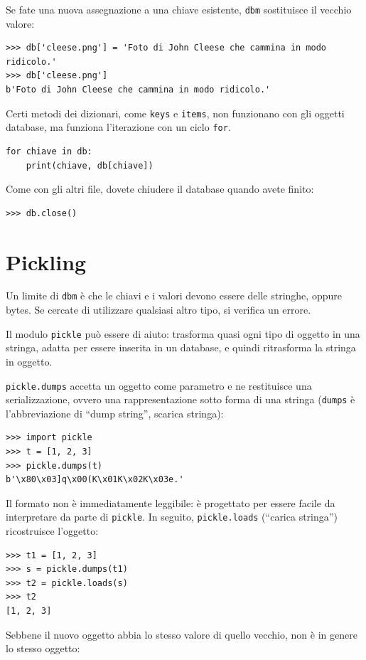 \documentclass[10pt]{book}
\begin{document}
Se fate una nuova assegnazione a una chiave esistente, {\tt dbm} sostituisce il vecchio valore:

\begin{verbatim}
>>> db['cleese.png'] = 'Foto di John Cleese che cammina in modo ridicolo.'
>>> db['cleese.png']
b'Foto di John Cleese che cammina in modo ridicolo.'
\end{verbatim}
%
Certi metodi dei dizionari, come {\tt keys} e {\tt items}, non funzionano con gli oggetti database, ma funziona l'iterazione con un ciclo {\tt for}.

\begin{verbatim}
for chiave in db:
    print(chiave, db[chiave])
\end{verbatim}
%
Come con gli altri file, dovete chiudere il database quando avete finito:

\begin{verbatim}
>>> db.close()
\end{verbatim}
%


\section{Pickling}

Un limite di {\tt dbm} è che le chiavi e i valori devono essere delle stringhe, oppure bytes. Se cercate di utilizzare qualsiasi altro tipo, si verifica un errore.

Il modulo {\tt pickle} può essere di aiuto: trasforma quasi ogni tipo di oggetto in una stringa, adatta per essere inserita in un database, e quindi ritrasforma la stringa in oggetto.

{\tt pickle.dumps} accetta un oggetto come parametro e ne restituisce una serializzazione, ovvero una rappresentazione sotto forma di una stringa ({\tt dumps} è l'abbreviazione di ``dump string'', scarica stringa):

\begin{verbatim}
>>> import pickle
>>> t = [1, 2, 3]
>>> pickle.dumps(t)
b'\x80\x03]q\x00(K\x01K\x02K\x03e.'
\end{verbatim}
%
Il formato non è immediatamente leggibile: è progettato per essere facile da interpretare da parte di {\tt pickle}. In seguito, {\tt pickle.loads}
(``carica stringa'') ricostruisce l'oggetto:

\begin{verbatim}
>>> t1 = [1, 2, 3]
>>> s = pickle.dumps(t1)
>>> t2 = pickle.loads(s)
>>> t2
[1, 2, 3]
\end{verbatim}
%
Sebbene il nuovo oggetto abbia lo stesso valore di quello vecchio, non è in genere lo stesso oggetto:
\end{document}

